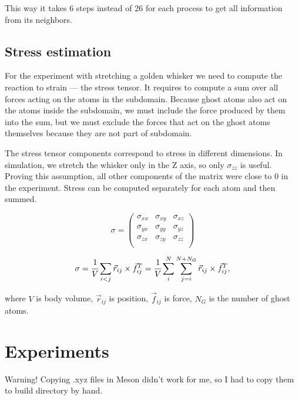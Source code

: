 \documentclass[12pt,a4paper]{article}
\newcommand{\mat}[1]{\vec{#1}}
\begin{document}
This way it takes 6 steps instead of 26 for each process to get all information from its neighbors.

\subsection*{Stress estimation}

For the experiment with stretching a golden whisker we need to compute the reaction to strain --- the stress tensor. It requires to compute a sum over all forces acting on the atoms in the subdomain. Because ghost atoms also act on the atoms inside the subdomain, we must include the force produced by them into the sum, but we must exclude the forces that act on the ghost atoms themselves because they are not part of subdomain.

The stress tensor components correspond to stress in different dimensions. In simulation, we stretch the whisker only in the Z axis, so only $\sigma_{zz}$ is useful. Proving this assumption, all other components of the matrix were close to 0 in the experiment. Stress can be computed separately for each atom and then summed.

\[
\sigma =
\begin{pmatrix}
	\sigma_{xx} &\sigma_{xy} &\sigma_{xz}\\
	\sigma_{yx} &\sigma_{yy} &\sigma_{yz}\\
	\sigma_{zx} &\sigma_{zy} &\sigma_{zz}\\
\end{pmatrix}
\]

\[
\sigma = \cfrac{1}{V} \sum_{i<j} \mat{r}_{ij} \times \mat{f}^T_{ij} = \cfrac{1}{V} \sum_i^{N} \sum_{j=i}^{N+N_G} \mat{r}_{ij} \times \mat{f}^T_{ij},
\]

where $V$ is body volume, $\mat{r}_{ij}$ is position, $\mat{f}_{ij}$ is force, $N_G$ is the number of ghost atoms.


\clearpage

\section{Experiments}
\label{experiments}

Warning! Copying .xyz files in Meson didn't work for me, so I had to copy them to build directory by hand.
	
\end{document}
